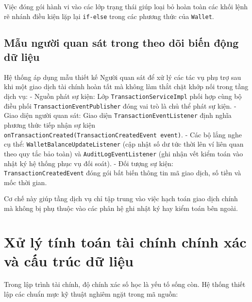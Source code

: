 \documentclass[a4paper,12pt]{report}
\newcommand{\passthrough}[1]{#1}
\begin{document}
Việc đóng gói hành vi vào các lớp trạng thái giúp loại bỏ hoàn toàn các
khối lệnh rẽ nhánh điều kiện lặp lại \passthrough{\lstinline!if-else!}
trong các phương thức của \passthrough{\lstinline!Wallet!}.

\subsection{Mẫu người quan sát trong theo dõi biến động dữ
liệu}\label{mux1eabu-ngux1b0ux1eddi-quan-suxe1t-trong-theo-duxf5i-biux1ebfn-ux111ux1ed9ng-dux1eef-liux1ec7u}

Hệ thống áp dụng mẫu thiết kế Người quan sát để xử lý các tác vụ phụ trợ
sau khi một giao dịch tài chính hoàn tất mà không làm thắt chặt khớp nối
trong tầng dịch vụ: - Nguồn phát sự kiện: Lớp
\passthrough{\lstinline!TransactionServiceImpl!} phối hợp cùng bộ điều
phối \passthrough{\lstinline!TransactionEventPublisher!} đóng vai trò là
chủ thể phát sự kiện. - Giao diện người quan sát: Giao diện
\passthrough{\lstinline!TransactionEventListener!} định nghĩa phương
thức tiếp nhận sự kiện
\passthrough{\lstinline!onTransactionCreated(TransactionCreatedEvent event)!}.
- Các bộ lắng nghe cụ thể:
\passthrough{\lstinline!WalletBalanceUpdateListener!} (cập nhật số dư
tức thời lên ví liên quan theo quy tắc bảo toàn) và
\passthrough{\lstinline!AuditLogEventListener!} (ghi nhận vết kiểm toán
vào nhật ký hệ thống phục vụ đối soát). - Đối tượng sự kiện:
\passthrough{\lstinline!TransactionCreatedEvent!} đóng gói bất biến
thông tin mã giao dịch, số tiền và mốc thời gian.

Cơ chế này giúp tầng dịch vụ chỉ tập trung vào việc hạch toán giao dịch
chính mà không bị phụ thuộc vào các phân hệ ghi nhật ký hay kiểm toán
bên ngoài.

\section{Xử lý tính toán tài chính chính xác và cấu trúc dữ
liệu}\label{xux1eed-luxfd-tuxednh-touxe1n-tuxe0i-chuxednh-chuxednh-xuxe1c-vuxe0-cux1ea5u-truxfac-dux1eef-liux1ec7u}

Trong lập trình tài chính, độ chính xác số học là yếu tố sống còn. Hệ
thống thiết lập các chuẩn mực kỹ thuật nghiêm ngặt trong mã nguồn:
\end{document}
